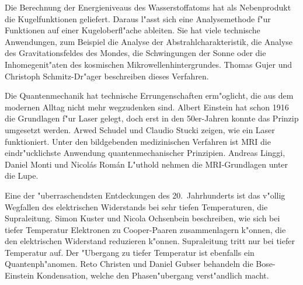 Die Berechnung der Energieniveaus des Wasserstoffatoms hat als
Nebenprodukt die Kugelfunktionen geliefert.
Daraus l"asst sich eine Analysemethode f"ur Funktionen auf einer
Kugeloberfl"ache ableiten.
Sie hat viele technische Anwendungen, zum Beispiel die Analyse der
Abstrahlcharakteristik, die Analyse des Gravitationsfeldes des
Mondes, die Schwingungen der Sonne oder die Inhomegenit"aten des
kosmischen Mikrowellenhintergrundes.
Thomas Gujer und Christoph Schmitz-Dr"ager beschreiben dieses Verfahren.

Die Quantenmechanik hat technische Errungenschaften erm"oglicht, die
aus dem modernen Alltag nicht mehr wegzudenken sind.
Albert Einstein hat schon 1916 die Grundlagen f"ur Laser gelegt,
doch erst in den 50er-Jahren konnte das Prinzip umgesetzt werden.
Arwed Schudel und Claudio Stucki zeigen, wie ein Laser funktioniert.
Unter den bildgebenden medizinischen Verfahren ist MRI die eindr"ucklichste
Anwendung quantenmechanischer Prinzipien.
Andreas Linggi, Daniel Monti und Nicol\'as Rom\'an L"uthold nehmen
die MRI-Grundlagen unter die Lupe.

Eine der "uberraschendsten Entdeckungen des 20.~Jahrhunderts ist das
v"ollig Wegfallen des elektrischen Widerstands bei sehr tiefen 
Temperaturen, die Supraleitung.
Simon Kuster und Nicola Ochsenbein beschreiben, wie sich bei tiefer
Temperatur Elektronen zu Cooper-Paaren zusammenlagern k"onnen, die
den elektrischen Widerstand reduzieren k"onnen.
Supraleitung tritt nur bei tiefer Temperatur auf.
Der "Ubergang zu tiefer Temperatur ist ebenfalls ein Quantenph"anomen.
Reto Christen und Daniel Gubser behandeln die Bose-Einstein Kondensation,
welche den Phasen"ubergang verst"andlich macht.



